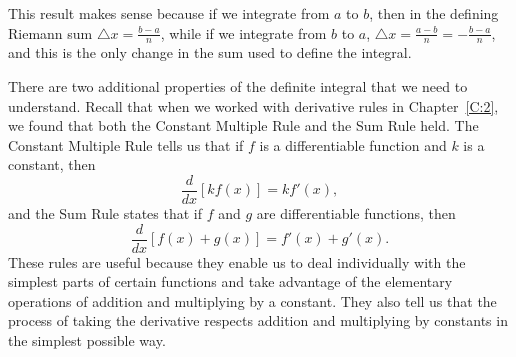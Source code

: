 \vspace*{5pt}
\noindent {}
\vspace*{1pt}

\noindent This result makes sense because if we integrate from $a$ to $b$, then in the defining Riemann sum $\triangle x = \frac{b-a}{n}$, while if we integrate from $b$ to $a$, $\triangle x = \frac{a-b}{n} = -\frac{b-a}{n}$, and this is the only change in the sum used to define the integral.

There are two additional properties of the definite integral that we need to understand.  Recall that when we worked with derivative rules in Chapter~\ref{C:2}, we found that both the Constant Multiple Rule and the Sum Rule held.  The Constant Multiple Rule tells us that if $f$ is a differentiable function and $k$ is a constant, then
$$\frac{d}{dx} [kf(x)] = kf'(x),$$
and the Sum Rule states that if $f$ and $g$ are differentiable functions, then
$$\frac{d}{dx}[f(x) + g(x)] = f'(x) + g'(x).$$
These rules are useful because they enable us to deal individually with the simplest parts of certain functions and take advantage of the elementary operations of addition and multiplying by a constant.  They also tell us that the process of taking the derivative respects addition and multiplying by constants in the simplest possible way.  

